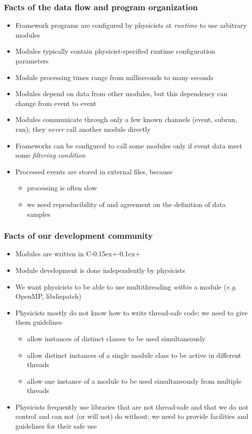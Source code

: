 \documentclass{beamer}
\newcommand{\cpp}{C\kern-0.15ex{+}\kern-0.1ex{+}\xspace}
\begin{document}
\begin{frame}
  \frametitle{Facts of the data flow and program organization}
  \begin{itemize}
    \item Framework programs are configured by physicists
          at \emph{runtime} to use
          arbitrary modules
    \item Modules typically contain physicist-specified
          runtime configuration parameters
    \item Module processing times range from milliseconds to many seconds
    \item Modules depend on data from other modules, but this dependency
          can change from event to event
    \item Modules communicate through only a few known channels (event,
          subrun, run); they \emph{never} call another module directly
    \item Frameworks can be configured to call some modules only if event
          data meet some \emph{filtering condition}
    \item Processed events are stored in external files, because
    \begin{itemize}
      \item processing is often slow
      \item we need reproducibility of and agreement on the definition of
            data samples
    \end{itemize}
  \end{itemize}
\end{frame}

\begin{frame}
  \frametitle{Facts of our development community}
  \begin{itemize}
    \item Modules are written in \cpp
    \item Module development is done independently by physicists
    \item We want physicists to be able to use multithreading \emph{within}
          a module (\textit{e.g.} OpenMP, libdispatch)
    \item Physicists mostly do not know how to write thread-safe code;
          we need to give them guidelines
    \begin{itemize}
      \item allow instances of distinct classes to be used simultaneously
      \item allow distinct instances of a single module class to be active
            in different threads
      \item allow one instance of a module to be used simultaneously from
            multiple threads
    \end{itemize}
    \item Physicists frequently use libraries that are not thread-safe and that
          we do not control and can not (or will not) do without; we need
          to provide facilities and guidelines for their safe use
  \end{itemize}
\end{frame}
\end{document}
